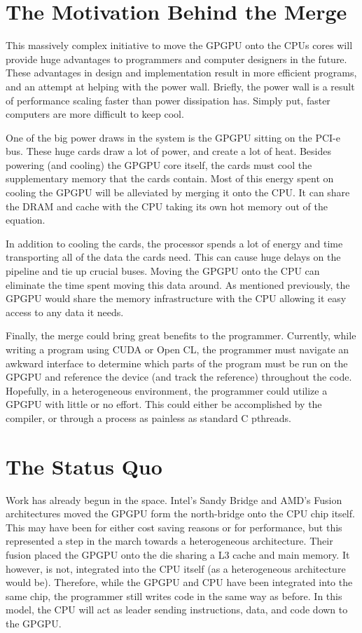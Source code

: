 \section*{The Motivation Behind the Merge}

This massively complex initiative to move the GPGPU onto the CPUs cores will provide huge advantages to programmers and computer designers in the future. These advantages in design and implementation result in more efficient programs, and an attempt at helping with the power wall. Briefly, the power wall is a result of performance scaling faster than power dissipation has. Simply put, faster computers are more difficult to keep cool.  

One of the big power draws in the system is the GPGPU sitting on the PCI-e bus. These huge cards draw a lot of power, and create a lot of heat. Besides powering (and cooling) the GPGPU core itself, the cards must cool the supplementary memory that the cards contain. Most of this energy spent on cooling the GPGPU will be alleviated by merging it onto the CPU. It can share the DRAM and cache with the CPU taking its own hot memory out of the equation. 

In addition to cooling the cards, the processor spends a lot of energy and time transporting all of the data the cards need. This can cause huge delays on the pipeline and tie up crucial buses. Moving the GPGPU onto the CPU can eliminate the time spent moving this data around. As mentioned previously, the GPGPU would share the memory infrastructure with the CPU allowing it easy access to any data it needs. 

Finally, the merge could bring great benefits to the programmer. Currently, while writing a program using CUDA or Open CL, the programmer must navigate an awkward interface to determine which parts of the program must be run on the GPGPU and reference the device (and track the reference) throughout the code. Hopefully, in a heterogeneous environment, the programmer could utilize a GPGPU with little or no effort. This could either be accomplished by the compiler, or through a process as painless as standard C pthreads. 

\section*{The Status Quo}

Work has already begun in the space. Intel's Sandy Bridge \cite{tlpcache} and AMD's Fusion \cite{cpuassist} architectures moved the GPGPU form the north-bridge onto the CPU chip itself.\cite{tlpcache} This may have been for either cost saving reasons or for performance, but this represented a step in the march towards a heterogeneous architecture. Their fusion placed the GPGPU onto the die sharing a L3 cache and main memory. It however, is not, integrated into the CPU itself (as a heterogeneous architecture would be). Therefore, while the GPGPU and CPU have been integrated into the same chip, the programmer still writes code in the same way as before. In this model, the CPU will act as leader sending instructions, data, and code down to the GPGPU. 

